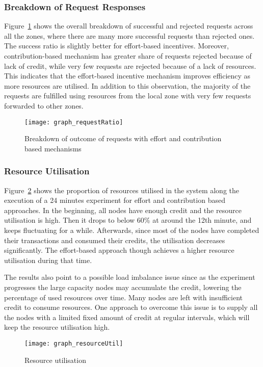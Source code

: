 \subsubsection{Breakdown of Request Responses}

Figure~\ref{fig:req_breakdown} shows the overall breakdown of successful and rejected requests across all the zones,
where there are many more successful requests than rejected ones. 
The success ratio is slightly better for effort-based incentives.
Moreover, contribution-based mechanism has greater share of requests rejected because of lack of credit,
while very few requests are rejected because of a lack of resources.
This indicates that the effort-based incentive mechanism improves efficiency as more resources are utilised. 
In addition to this observation, the majority of the requests are fulfilled using resources from the local zone with very few requests forwarded to other zones. 

\begin{figure}[tbp]
   \centering
   \texttt{[image: graph\_requestRatio]}
   \caption[Breakdown of outcome of requests]{Breakdown of outcome of requests with effort and contribution based mechanisms}
   \label{fig:req_breakdown}
\end{figure}

\subsubsection{Resource Utilisation}

Figure~\ref{fig:res_util} shows the proportion of resources utilised in the system 
along the execution of a 24 minutes experiment for effort and contribution based approaches. 
In the beginning, all nodes have enough credit and the resource utilisation is high. 
Then it drops to below 60\% at around the 12th minute, 
and keeps fluctuating for a while. 
Afterwards, since most of the nodes have completed their transactions and consumed their credits, 
the utilisation decreases significantly. 
The effort-based approach though achieves a higher resource utilisation during that time. 

The results also point to a possible load imbalance issue since as the experiment progresses 
the large capacity nodes may accumulate the credit, lowering the percentage of used resources over time. 
Many nodes are left with insufficient credit to consume resources. 
One approach to overcome this issue is to supply all the nodes 
with a limited fixed amount of credit at regular intervals, which will keep the resource utilisation high.

\begin{figure}[tbp]
   \centering
   \texttt{[image: graph\_resourceUtil]}
   \caption{Resource utilisation}
   \label{fig:res_util}
\end{figure}
